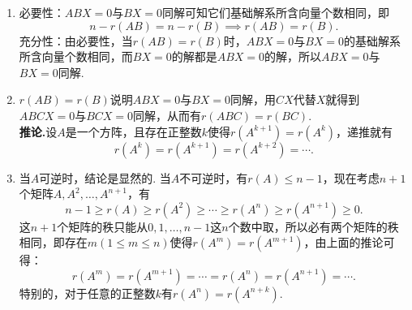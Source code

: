 \documentclass[UTF8,12pt,a4paper,fontset=fandol]{ctexart}
\begin{document}
\begin{solve}
\begin{enumerate}
                \item 必要性：$ABX=0$与$BX=0$同解可知它们基础解系所含向量个数相同，即
                      \[ n-r(AB)=n-r(B)\implies r(AB)=r(B). \]
                      充分性：由必要性，当$r(AB)=r(B)$时，$ABX=0$与$BX=0$的基础解系所含向量个数相同，而$BX=0$的解都是$ABX=0$的解，所以$ABX=0$与$BX=0$同解.

                \item $r(AB)=r(B)$说明$ABX=0$与$BX=0$同解，用$CX$代替$X$就得到$ABCX=0$与$BCX=0$同解，从而有$r(ABC)=r(BC)$.\\
                      \textbf{推论.}设$A$是一个方阵，且存在正整数$k$使得$r(A^{k+1})=r(A^k)$，递推就有
                      \[ r(A^k)=r(A^{k+1})=r(A^{k+2})=\cdots. \]

                \item 当$A$可逆时，结论是显然的. 当$A$不可逆时，有$r(A)\leqslant n-1$，现在考虑$n+1$个矩阵$A,A^2,\ldots,A^{n+1}$，有
                      \[ n-1\geqslant r(A)\geqslant r(A^2)\geqslant\cdots\geqslant r(A^n)\geqslant r(A^{n+1})\geqslant 0. \]
                      这$n+1$个矩阵的秩只能从$0,1,\ldots,n-1$这$n$个数中取，所以必有两个矩阵的秩相同，即存在$m(1\leqslant m\leqslant n)$使得$r(A^m)=r(A^{m+1})$，由上面的推论可得：
                      \[ r(A^m)=r(A^{m+1})=\cdots=r(A^{n})=r(A^{n+1})=\cdots. \]
                      特别的，对于任意的正整数$k$有$r(A^n)=r(A^{n+k})$.
            \end{enumerate}
\end{solve}
\end{document}
